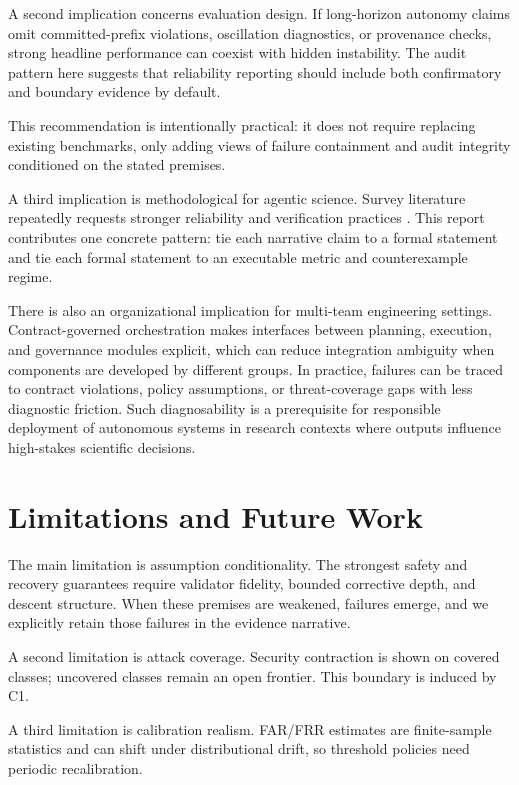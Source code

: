 \documentclass{article} %
\begin{document}
A second implication concerns evaluation design. If long-horizon autonomy claims omit committed-prefix violations, oscillation diagnostics, or provenance checks, strong headline performance can coexist with hidden instability. The audit pattern here suggests that reliability reporting should include both confirmatory and boundary evidence by default.

This recommendation is intentionally practical: it does not require replacing existing benchmarks, only adding views of failure containment and audit integrity conditioned on the stated premises.

A third implication is methodological for agentic science. Survey literature repeatedly requests stronger reliability and verification practices \citep{xin2025,reddy2025,wei2025,ferrag2025}. This report contributes one concrete pattern: tie each narrative claim to a formal statement and tie each formal statement to an executable metric and counterexample regime.

There is also an organizational implication for multi-team engineering settings. Contract-governed orchestration makes interfaces between planning, execution, and governance modules explicit, which can reduce integration ambiguity when components are developed by different groups. In practice, failures can be traced to contract violations, policy assumptions, or threat-coverage gaps with less diagnostic friction. Such diagnosability is a prerequisite for responsible deployment of autonomous systems in research contexts where outputs influence high-stakes scientific decisions.

\section{Limitations and Future Work}
\label{sec:limitations}
The main limitation is assumption conditionality. The strongest safety and recovery guarantees require validator fidelity, bounded corrective depth, and descent structure. When these premises are weakened, failures emerge, and we explicitly retain those failures in the evidence narrative.

A second limitation is attack coverage. Security contraction is shown on covered classes; uncovered classes remain an open frontier. This boundary is induced by C1.

A third limitation is calibration realism. FAR/FRR estimates are finite-sample statistics and can shift under distributional drift, so threshold policies need periodic recalibration.
\end{document}
